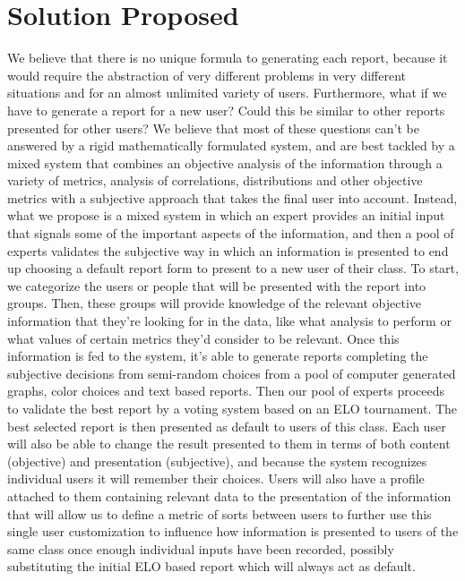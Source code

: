 \section{Solution Proposed}
\label{cap1:sec:solution}

We believe that there is no unique formula to generating each report, because it would require the abstraction of very different problems in very different situations and for an almost unlimited variety of users. 
Furthermore, what if we have to generate a report for a new user? Could this be similar to other reports presented for other users? 
We believe that most of these questions can't be answered by a rigid mathematically formulated system, and are best tackled by a mixed system that combines an objective analysis of the information through a variety of metrics, analysis of correlations, distributions and other objective metrics with a subjective approach that takes the final user into account.
Instead, what we propose is a mixed system in which an expert provides an initial input that signals some of the important aspects of the information, and then a pool of experts validates the subjective way in which an information is presented to end up choosing a default report form to present to a new user of their class.
To start, we categorize the users or people that will be presented with the report into groups. Then, these groups will provide knowledge of the relevant objective information that they're looking for in the data, like what analysis to perform or what values of certain metrics they'd consider to be relevant.
Once this information is fed to the system, it's able to generate reports completing the subjective decisions from semi-random choices from a pool of computer generated graphs, color choices and text based reports.
Then our pool of experts proceeds to validate the best report by a voting system based on an ELO tournament. 
The best selected report is then presented as default to users of this class. 
Each user will also be able to change the result presented to them in terms of both content (objective) and presentation (subjective), and because the system recognizes individual users it will remember their choices.
Users will also have a profile attached to them containing relevant data to the presentation of the information that will allow us to define a metric of sorts between users to further use this single user customization to influence how information is presented to users of the same class once enough individual inputs have been recorded, possibly substituting the initial ELO based report which will always act as default.


